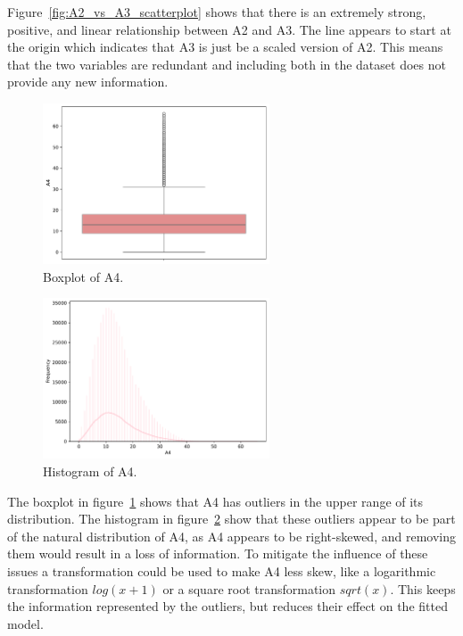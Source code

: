 \documentclass[11pt]{report}
\begin{document}
Figure~\ref{fig:A2_vs_A3_scatterplot} shows that there is an extremely strong, positive, and linear relationship between A2 and A3. The line appears to start at the origin which indicates that A3 is just be a scaled version of A2. This means that the two variables are redundant and including both in the dataset does not provide any new information.

\begin{figure}[H]
    \centering
    \includegraphics[width=0.6\textwidth]{images/A4_boxplot.pdf}
    \caption{Boxplot of A4.}
    \label{fig:a4_boxplot}
\end{figure}

\begin{figure}[H]
    \centering
    \includegraphics[width=0.6\textwidth]{images/A4_histplot.pdf}
    \caption{Histogram of A4.}
    \label{fig:a4_histplot}
\end{figure}

The boxplot in figure~\ref{fig:a4_boxplot} shows that A4 has outliers in the upper range of its distribution. The histogram in figure~\ref{fig:a4_histplot} show that these outliers appear to be part of the natural distribution of A4, as A4 appears to be right-skewed, and removing them would result in a loss of information. To mitigate the influence of these issues a transformation could be used to make A4 less skew, like a logarithmic transformation $log(x+1)$ or a square root transformation $sqrt(x)$. This keeps the information represented by the outliers, but reduces their effect on the fitted model.
\end{document}
